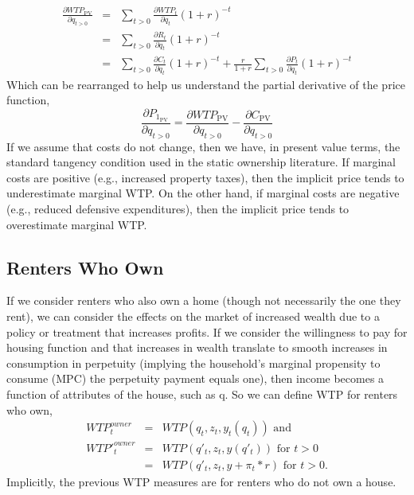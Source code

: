 \documentclass[ecta,nameyear,draft]{econsocart}
\theoremstyle{plain}
\theoremstyle{remark}
\begin{document}
\begin{eqnarray}
\frac{\partial \mathit{WTP}_{\mathrm{PV}}}{\partial q_{t>0}}&=&\sum_{t>0} \frac{\partial \mathit{WTP}_t}{\partial q_t}(1+r)^{-t}\\ \label{pvmwtp}
&=&\sum_{t>0} \frac{\partial R_t}{\partial q_t}(1+r)^{-t}\nonumber\\
&=&\sum_{t>0} \frac{\partial C_t}{\partial q_t}(1+r)^{-t}+\frac{r}{1+r}\sum_{t>0} \frac{\partial P_t}{\partial q_t}(1+r)^{-t}\nonumber
\end{eqnarray}
Which can be rearranged to help us understand the partial derivative of the price function,
\begin{equation}
	\frac{\partial P_{1_{\mathrm{PV}}}} {\partial q_{t>0}}=\frac{\partial \mathit{WTP}_{\mathrm{PV}}}{\partial q_{t>0}}-\frac{\partial C_{\mathrm{PV}}}{\partial q_{t>0}} \label{marginalPrice}
\end{equation}
If we assume that costs do not change, then we have, in present value terms, the standard tangency condition used in the static ownership literature. If marginal costs are positive (e.g., increased property taxes), then the implicit price tends to underestimate marginal WTP. On the other hand, if marginal costs are negative (e.g., reduced defensive expenditures), then the implicit price tends to overestimate marginal WTP.

\subsection{Renters Who Own}
If we consider renters who also own a home (though not necessarily the one they rent), we can consider the effects on the market of increased wealth due to a policy or treatment that increases profits. If we consider the willingness to pay for housing function and that increases in wealth translate to smooth increases in consumption in perpetuity (implying the household's marginal propensity to consume (MPC) the perpetuity payment equals one), then income becomes a function of attributes of the house, such as q. So we can define WTP for renters who own,
\begin{eqnarray*}	
	\mathit{WTP}_t^{\mathit{owner}}&=&\mathit{WTP}(q_t,z_t,y_t(q_t)) \text{ and} \\
	\mathit{WTP'}_t^{\mathit{owner}}&=&\mathit{WTP}(q'_t,z_t,y(q'_t)) \text{ for } t>0\\
	&=&	\mathit{WTP}(q'_t,z_t,y+\pi_t*r) \text{ for } t>0.
\end{eqnarray*}
Implicitly, the previous WTP measures are for renters who do not own a house.
\end{document}
